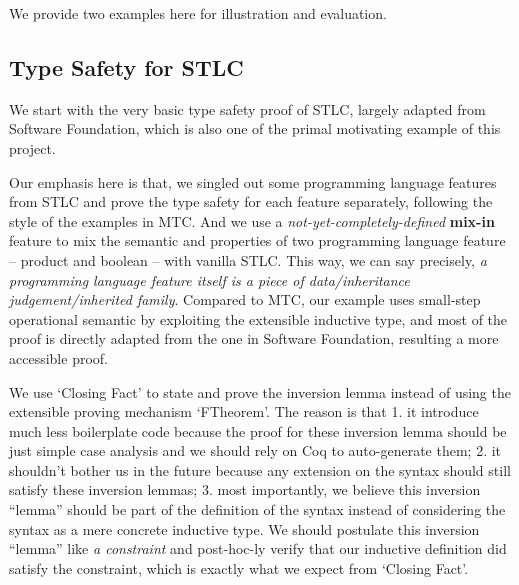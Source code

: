 We provide two examples here for illustration and evaluation. 

\subsection{Type Safety for STLC}
We start with the very basic type safety proof of STLC, largely adapted from Software Foundation, which is also one of the primal motivating example of this project. 

Our emphasis here is that, we singled out some programming language features from STLC and prove the type safety for each feature separately, following the style of the examples in MTC\citep{delaware2013,forsta2020}. And we use a \textit{not-yet-completely-defined} \textbf{mix-in} feature to mix the semantic and properties of two programming language feature -- product and boolean -- with vanilla STLC. This way, we can say precisely, \textit{a programming language feature itself is a piece of data/inheritance judgement/inherited family}. Compared to MTC, our example uses small-step operational semantic by exploiting the extensible inductive type, and most of the proof is directly adapted from the one in Software Foundation, resulting a more accessible proof. 

We use `Closing Fact' to state and prove the inversion lemma instead of using the extensible proving mechanism `FTheorem'. The reason is that 1. it introduce much less boilerplate code because the proof for these inversion lemma should be just simple case analysis and we should rely on Coq to auto-generate them; 2. it shouldn't bother us in the future because any extension on the syntax should still satisfy these inversion lemmas; 3. most importantly, we believe this inversion ``lemma'' should be part of the definition of the syntax instead of considering the syntax as a mere concrete inductive type. We should postulate this inversion ``lemma'' like \textit{a constraint} and post-hoc-ly verify that our inductive definition did satisfy the constraint, which is exactly what we expect from `Closing Fact'.

